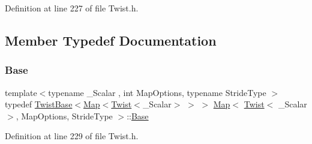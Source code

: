 Definition at line 227 of file Twist.\+h.



\subsection{Member Typedef Documentation}
\hypertarget{class_map_3_01_twist_3_01___scalar_01_4_00_01_map_options_00_01_stride_type_01_4_a1d92d7e062d98f16684181244775ea6c}{}\label{class_map_3_01_twist_3_01___scalar_01_4_00_01_map_options_00_01_stride_type_01_4_a1d92d7e062d98f16684181244775ea6c} 
\subsubsection{\texorpdfstring{Base}{Base}}
{\footnotesize\ttfamily template$<$typename \+\_\+\+Scalar , int Map\+Options, typename Stride\+Type $>$ \\
typedef \hyperlink{class_twist_base}{Twist\+Base}$<$\hyperlink{class_map_3_01_twist_3_01___scalar_01_4_00_01_map_options_00_01_stride_type_01_4_a7bc49d9365cdda555f4d107d55a1c6b2}{Map}$<$\hyperlink{class_twist}{Twist}$<$\+\_\+\+Scalar$>$ $>$ $>$ \hyperlink{class_map_3_01_twist_3_01___scalar_01_4_00_01_map_options_00_01_stride_type_01_4_a7bc49d9365cdda555f4d107d55a1c6b2}{Map}$<$ \hyperlink{class_twist}{Twist}$<$ \+\_\+\+Scalar $>$, Map\+Options, Stride\+Type $>$\+::\hyperlink{class_map_3_01_twist_3_01___scalar_01_4_00_01_map_options_00_01_stride_type_01_4_a1d92d7e062d98f16684181244775ea6c}{Base}\hspace{0.3cm}{\ttfamily [protected]}}



Definition at line 229 of file Twist.\+h.

\hypertarget{class_map_3_01_twist_3_01___scalar_01_4_00_01_map_options_00_01_stride_type_01_4_aed5862495c86340dcb689412d79eb66a}{}\label{class_map_3_01_twist_3_01___scalar_01_4_00_01_map_options_00_01_stride_type_01_4_aed5862495c86340dcb689412d79eb66a} 
